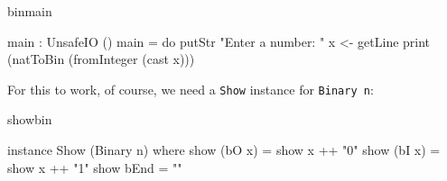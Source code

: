 \begin{SaveVerbatim}{binmain}

main : UnsafeIO ()
main = do putStr "Enter a number: "
          x <- getLine
          print (natToBin (fromInteger (cast x)))

\end{SaveVerbatim}

\noindent
For this to work, of course, we need a \texttt{Show} instance for \texttt{Binary n}:

\begin{SaveVerbatim}{showbin}

instance Show (Binary n) where
    show (bO x) = show x ++ "0"
    show (bI x) = show x ++ "1"
    show bEnd = ""

\end{SaveVerbatim}

